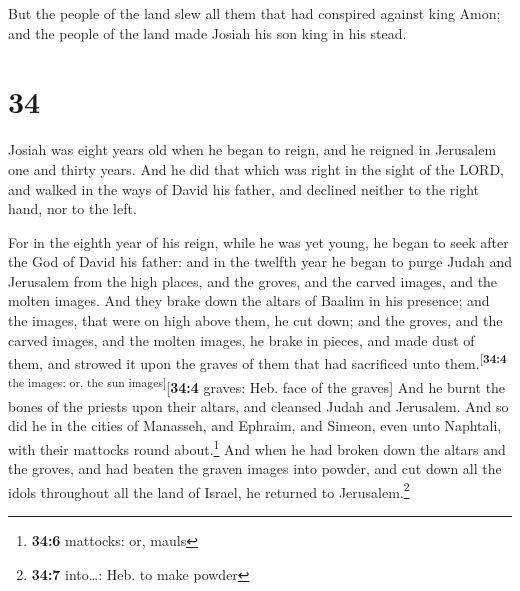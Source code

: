  But the people of the land slew all them that had
conspired against king Amon; and the people of the land made Josiah his
son king in his stead.

\hypertarget{section-33}{%
\section{34}\label{section-33}}

 Josiah was eight years old when he began to reign, and he
reigned in Jerusalem one and thirty years.  And he did
that which was right in the sight of the LORD, and walked in the ways of
David his father, and declined neither to the right hand, nor to the
left.

 For in the eighth year of his reign, while he was yet
young, he began to seek after the God of David his father: and in the
twelfth year he began to purge Judah and Jerusalem from the high places,
and the groves, and the carved images, and the molten images.
 And they brake down the altars of Baalim in his presence;
and the images, that were on high above them, he cut down; and the
groves, and the carved images, and the molten images, he brake in
pieces, and made dust of them, and strowed it upon the graves of them
that had sacrificed unto them.\textsuperscript{{[}\textbf{34:4} the
images: or, the sun images{]}}{[}\textbf{34:4} graves: Heb. face of the
graves{]}  And he burnt the bones of the priests upon
their altars, and cleansed Judah and Jerusalem.  And so
did he in the cities of Manasseh, and Ephraim, and Simeon, even unto
Naphtali, with their mattocks round about.\footnote{\textbf{34:6}
  mattocks: or, mauls}  And when he had broken down the
altars and the groves, and had beaten the graven images into powder, and
cut down all the idols throughout all the land of Israel, he returned to
Jerusalem.\footnote{\textbf{34:7} into\ldots: Heb. to make powder}

